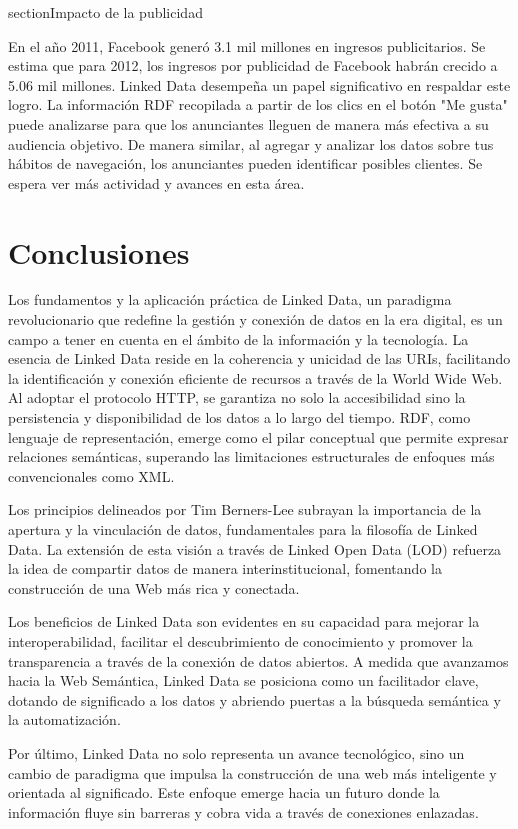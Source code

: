 \documentclass[11pt]{report}
\begin{document}
section{Impacto de la publicidad}

		En el año 2011, Facebook generó 3.1 mil millones en ingresos publicitarios. Se estima que para 2012, los ingresos por publicidad de Facebook habrán crecido a 5.06 mil millones. Linked Data desempeña un papel significativo en respaldar este logro. La información RDF recopilada a partir de los clics en el botón "Me gusta" puede analizarse para que los anunciantes lleguen de manera más efectiva a su audiencia objetivo. De manera similar, al agregar y analizar los datos sobre tus hábitos de navegación, los anunciantes pueden identificar posibles clientes. Se espera ver más actividad y avances en esta área.

\chapter{Conclusiones}
Los fundamentos y la aplicación práctica de Linked Data, un paradigma revolucionario que redefine la gestión y conexión de datos en la era digital, es un campo a tener en cuenta en el ámbito de la información y la tecnología. La esencia de Linked Data reside en la coherencia y unicidad de las URIs, facilitando la identificación y conexión eficiente de recursos a través de la World Wide Web. Al adoptar el protocolo HTTP, se garantiza no solo la accesibilidad sino la persistencia y disponibilidad de los datos a lo largo del tiempo. RDF, como lenguaje de representación, emerge como el pilar conceptual que permite expresar relaciones semánticas, superando las limitaciones estructurales de enfoques más convencionales como XML.

Los principios delineados por Tim Berners-Lee subrayan la importancia de la apertura y la vinculación de datos, fundamentales para la filosofía de Linked Data. La extensión de esta visión a través de Linked Open Data (LOD) refuerza la idea de compartir datos de manera interinstitucional, fomentando la construcción de una Web más rica y conectada.

Los beneficios de Linked Data son evidentes en su capacidad para mejorar la interoperabilidad, facilitar el descubrimiento de conocimiento y promover la transparencia a través de la conexión de datos abiertos. A medida que avanzamos hacia la Web Semántica, Linked Data se posiciona como un facilitador clave, dotando de significado a los datos y abriendo puertas a la búsqueda semántica y la automatización.

Por último, Linked Data no solo representa un avance tecnológico, sino un cambio de paradigma que impulsa la construcción de una web más inteligente y orientada al significado. Este enfoque emerge hacia un futuro donde la información fluye sin barreras y cobra vida a través de conexiones enlazadas.
\end{document}
